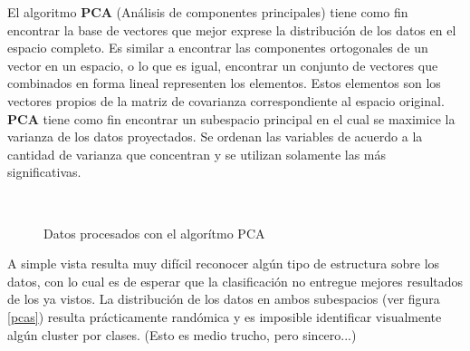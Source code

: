 \documentclass[12pt,a4paper,titlepage]{report}
\begin{document}
El algoritmo \textbf{PCA} (Análisis de componentes principales) tiene como fin encontrar la base de vectores que mejor exprese la distribución de los datos en el espacio completo. Es similar a encontrar las componentes ortogonales de un vector en un espacio, o lo que es igual, encontrar un conjunto de vectores que combinados en forma lineal representen los elementos. Estos elementos son los vectores propios de la matriz de covarianza correspondiente al espacio original. \textbf{PCA} tiene como fin encontrar un subespacio principal en el cual se maximice la varianza de los datos proyectados. Se ordenan las variables de acuerdo a la cantidad de varianza que concentran y se utilizan solamente las más significativas.
\vspace{-.5cm}
\begin{figure} [H]
\centering
   \\
  \caption{Datos procesados con el algorítmo PCA} 
  \label{fig:pcas}
\end{figure}

A simple vista resulta muy difícil reconocer algún tipo de estructura sobre los datos, con lo cual es de esperar que la clasificación no entregue mejores resultados de los ya vistos. La distribución de los datos en ambos subespacios (ver figura \ref{pcas}) resulta prácticamente randómica y es imposible identificar visualmente algún cluster por clases. (Esto es medio trucho, pero sincero...)\\
\end{document}
